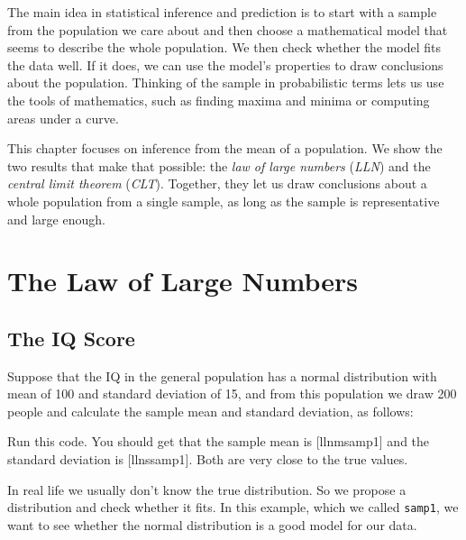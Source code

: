 The main idea in statistical inference and prediction is to start with a sample
from the population we care about and then choose a mathematical model that
seems to describe the whole population. We then check whether the model fits
the data well. If it does, we can use the model's properties to draw
conclusions about the population. Thinking of the sample in probabilistic
terms lets us use the tools of mathematics, such as finding maxima and minima
or computing areas under a curve.

This chapter focuses on inference from the mean of a population. We show the
two results that make that possible: the \emph{law of large numbers}
(\emph{LLN}) and the \emph{central limit theorem} (\emph{CLT}). Together,
they let us draw conclusions about a whole population from a single sample,
as long as the sample is representative and large enough.


\section{The Law of Large Numbers}

\subsection{The IQ Score}

Suppose that the IQ in the general population has a normal distribution with
mean of 100 and  standard deviation of 15, and from this population we draw 200
people and calculate the sample mean and standard deviation, as follows:


Run this code. You should get that the sample mean is
[llnmsamp1] and the standard deviation is
[llnssamp1]. Both are very close to the true values.

In real life we usually don't know the true distribution. So we propose a
distribution and check whether it fits. In this example, which we called
\lstinline{samp1}, we want to see whether the normal distribution is a good
model for our data.

